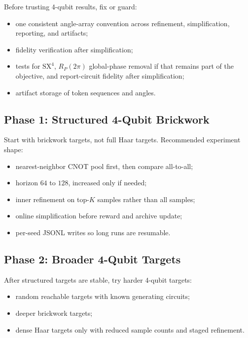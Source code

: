 \documentclass[11pt]{article}
\begin{document}
Before trusting 4-qubit results, fix or guard:

\begin{itemize}[leftmargin=*]
  \item one consistent angle-array convention across refinement, simplification,
  reporting, and artifacts;
  \item fidelity verification after simplification;
  \item tests for \(\mathrm{SX}^4\), \(R_P(2\pi)\) global-phase removal if that
  remains part of the objective, and report-circuit fidelity after
  simplification;
  \item artifact storage of token sequences and angles.
\end{itemize}

\subsection{Phase 1: Structured 4-Qubit Brickwork}

Start with brickwork targets, not full Haar targets.  Recommended experiment
shape:

\begin{itemize}[leftmargin=*]
  \item nearest-neighbor CNOT pool first, then compare all-to-all;
  \item horizon \(64\) to \(128\), increased only if needed;
  \item inner refinement on top-\(K\) samples rather than all samples;
  \item online simplification before reward and archive update;
  \item per-seed JSONL writes so long runs are resumable.
\end{itemize}

\subsection{Phase 2: Broader 4-Qubit Targets}

After structured targets are stable, try harder 4-qubit targets:

\begin{itemize}[leftmargin=*]
  \item random reachable targets with known generating circuits;
  \item deeper brickwork targets;
  \item dense Haar targets only with reduced sample counts and staged
  refinement.
\end{itemize}
\end{document}
